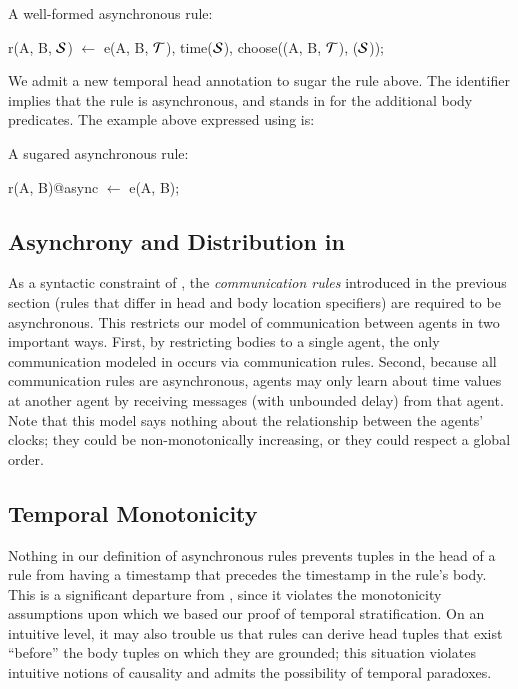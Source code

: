 \begin{example}
A well-formed asynchronous \lang rule:

\begin{Dedalus}
r(A, B, \(\SDedalus\)) \(\leftarrow\) 
  e(A, B, \(\Tau\)),
  time(\(\SDedalus\)), choose((A, B, \(\Tau\)), (\(\SDedalus\)));
\end{Dedalus}
\end{example}

We admit a new temporal head annotation to sugar the rule above.  The
identifier  implies that the rule is asynchronous, and stands in for
the additional body predicates.
The example above expressed using  is:

\begin{example}
	A sugared asynchronous \lang rule:
	
\begin{Dedalus}
r(A, B)@async \(\leftarrow\) e(A, B);
\end{Dedalus}
\end{example}

\subsection{Asynchrony and Distribution in {\large{\bf\lang}}}
As a syntactic constraint of \lang, the {\em communication rules} introduced in the previous section (rules that differ in head and body location specifiers) are required to be asynchronous.
This restricts our model of communication between agents in two important ways.
First, by restricting bodies to a single agent, the only communication
modeled in \lang occurs via communication rules.  Second, because
all communication rules are asynchronous, agents may only learn about
time values at another agent by receiving messages (with unbounded
delay) from that agent.  Note that this model says nothing about the
relationship between the agents' clocks; they could be
non-monotonically increasing, or they could respect a global order.

\subsection{Temporal Monotonicity}
Nothing in our definition of asynchronous rules prevents tuples in the
head of a rule from having a timestamp that precedes the timestamp in
the rule's body. This is a significant departure from \slang, since it
violates the monotonicity assumptions upon which we based 
our proof of
temporal stratification.  On an intuitive level, it may also trouble
us that rules can derive head tuples that exist ``before'' the body
tuples on which they are grounded; this situation violates intuitive notions of
causality and admits the possibility of temporal paradoxes.

